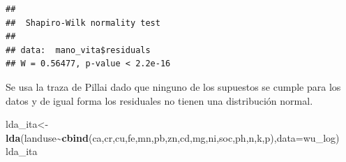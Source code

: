 \documentclass[
]{article}
\newenvironment{Shaded}{\begin{snugshade}}{\end{snugshade}}
\newcommand{\AttributeTok}[1]{\textcolor[rgb]{0.13,0.29,0.53}{#1}}
\newcommand{\FunctionTok}[1]{\textcolor[rgb]{0.13,0.29,0.53}{\textbf{#1}}}
\newcommand{\NormalTok}[1]{#1}
\newcommand{\OtherTok}[1]{\textcolor[rgb]{0.56,0.35,0.01}{#1}}
\newcommand{\SpecialCharTok}[1]{\textcolor[rgb]{0.81,0.36,0.00}{\textbf{#1}}}
\begin{document}
\begin{Shaded}
\end{Shaded}

\begin{verbatim}
## 
##  Shapiro-Wilk normality test
## 
## data:  mano_vita$residuals
## W = 0.56477, p-value < 2.2e-16
\end{verbatim}

Se usa la traza de Pillai dado que ninguno de los supuestos se cumple
para los datos y de igual forma los residuales no tienen una
distribución normal.

\begin{Shaded}
\begin{Highlighting}[]
\NormalTok{lda\_ita}\OtherTok{\textless{}{-}}\FunctionTok{lda}\NormalTok{(landuse}\SpecialCharTok{\textasciitilde{}}\FunctionTok{cbind}\NormalTok{(ca,cr,cu,fe,mn,pb,zn,cd,mg,ni,soc,ph,n,k,p),}\AttributeTok{data=}\NormalTok{wu\_log)}
\NormalTok{lda\_ita}
\end{Highlighting}
\end{Shaded}
\end{document}
